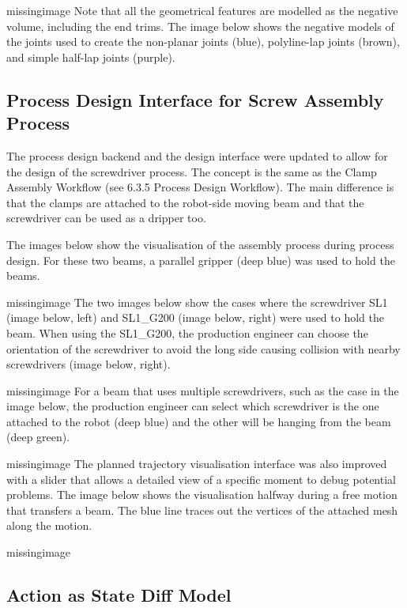 missingimage
Note that all the geometrical features are modelled as the negative volume, including the end trims. The image below shows the negative models of the joints used to create the non-planar joints (blue), polyline-lap joints (brown), and simple half-lap joints (purple).

\subsection{Process Design Interface for Screw Assembly Process}
\label{subsection:exploration_4_process_design_interface_for_screw_assembly_process}

The process design backend and the design interface were updated to allow for the design of the screwdriver process. The concept is the same as the Clamp Assembly Workflow (see 6.3.5 Process Design Workflow). The main difference is that the clamps are attached to the robot-side moving beam and that the screwdriver can be used as a dripper too.

The images below show the visualisation of the assembly process during process design. For these two beams, a parallel gripper (deep blue) was used to hold the beams.

missingimage
The two images below show the cases where the screwdriver SL1 (image below, left) and SL1\_G200 (image below, right) were used to hold the beam. When using the SL1\_G200, the production engineer can choose the orientation of the screwdriver to avoid the long side causing collision with nearby screwdrivers (image below, right). 

missingimage
For a beam that uses multiple screwdrivers, such as the case in the image below, the production engineer can select which screwdriver is the one attached to the robot (deep blue) and the other will be hanging from the beam (deep green).

missingimage
The planned trajectory visualisation interface was also improved with a slider that allows a detailed view of a specific moment to debug potential problems. The image below shows the visualisation halfway during a free motion that transfers a beam. The blue line traces out the vertices of the attached mesh along the motion.

missingimage

\subsection{Action as State Diff Model} 
\label{subsection:exploration_4_action_as_state_diff_model}

